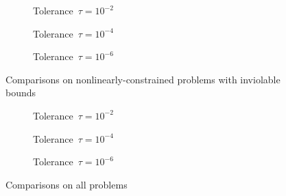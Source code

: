 \begin{figure}[ht]
    \centering
    \begin{subfigure}[b]{0.49\textwidth}
        \centering
        \caption{Tolerance~$\tau = 10^{-2}$}
    \end{subfigure}
    \hfill
    \begin{subfigure}[b]{0.49\textwidth}
        \centering
        \caption{Tolerance~$\tau = 10^{-4}$}
    \end{subfigure}
    \begin{subfigure}[b]{0.49\textwidth}
        \centering
        \caption{Tolerance~$\tau = 10^{-6}$}
    \end{subfigure}
    \caption{Comparisons on nonlinearly-constrained problems with inviolable bounds}
\end{figure}

\begin{figure}[ht]
    \centering
    \begin{subfigure}[b]{0.49\textwidth}
        \centering
        \caption{Tolerance~$\tau = 10^{-2}$}
    \end{subfigure}
    \hfill
    \begin{subfigure}[b]{0.49\textwidth}
        \centering
        \caption{Tolerance~$\tau = 10^{-4}$}
    \end{subfigure}
    \begin{subfigure}[b]{0.49\textwidth}
        \centering
        \caption{Tolerance~$\tau = 10^{-6}$}
    \end{subfigure}
    \caption{Comparisons on all problems}
\end{figure}

